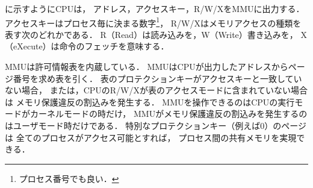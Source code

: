 に示すようにCPUは，
アドレス，アクセスキー，R/W/XをMMUに出力する．
アクセスキーはプロセス毎に決まる数字\footnote{プロセス番号でも良い．}，
R/W/Xはメモリアクセスの種類を表す次のどれかである．
R（Read）は読み込みを，W（Write）書き込みを，
X（eXecute）は命令のフェッチを意味する．

MMUは許可情報表を内蔵している．
MMUはCPUが出力したアドレスからページ番号を求め表を引く．
表のプロテクションキーがアクセスキーと一致していない場合，
または，CPUのR/W/Xが表のアクセスモードに含まれていない場合は
メモリ保護違反の割込みを発生する．
MMUを操作できるのはCPUの実行モードがカーネルモードの時だけ，
MMUがメモリ保護違反の割込みを発生するのはユーザモード時だけである．
特別なプロテクションキー（例えば0）のページは
全てのプロセスがアクセス可能とすれば，
プロセス間の共有メモリを実現できる．

